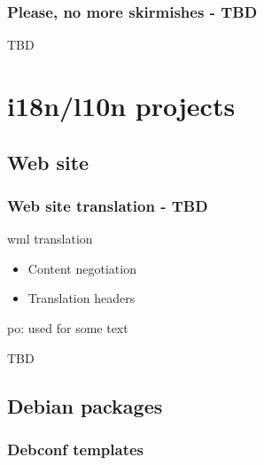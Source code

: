 \documentclass{beamer}
\begin{document}
\begin{frame}
  \frametitle{Please, no more skirmishes - TBD}
	\begin{block}
		TBD
	\end{block}
\end{frame}


\section{i18n/l10n projects}

\subsection{Web site}

\begin{frame}
  \frametitle{Web site translation - TBD}
	\begin{block}
		{wml translation}
		\begin{itemize}
		\item Content negotiation
		\item Translation headers
		\end{itemize}
	\end{block}
	\begin{block}
		{po: used for some text}
	\end{block}
	\begin{block}
		{TBD}
	\end{block}
\end{frame}


\subsection{Debian packages}

\subsubsection{Debconf templates}
\end{document}
